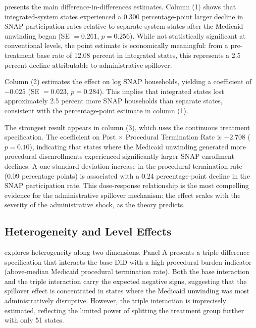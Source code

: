 \documentclass[12pt]{article}
\begin{document}


 presents the main difference-in-differences estimates. Column (1) shows that integrated-system states experienced a 0.300 percentage-point larger decline in SNAP participation rates relative to separate-system states after the Medicaid unwinding began (SE $= 0.261$, $p = 0.256$). While not statistically significant at conventional levels, the point estimate is economically meaningful: from a pre-treatment base rate of 12.08 percent in integrated states, this represents a 2.5 percent decline attributable to administrative spillover.

Column (2) estimates the effect on log SNAP households, yielding a coefficient of $-0.025$ (SE $= 0.023$, $p = 0.284$). This implies that integrated states lost approximately 2.5 percent more SNAP households than separate states, consistent with the percentage-point estimate in column (1).

The strongest result appears in column (3), which uses the continuous treatment specification. The coefficient on Post $\times$ Procedural Termination Rate is $-2.708$ ($p = 0.10$), indicating that states where the Medicaid unwinding generated more procedural disenrollments experienced significantly larger SNAP enrollment declines. A one-standard-deviation increase in the procedural termination rate (0.09 percentage points) is associated with a 0.24 percentage-point decline in the SNAP participation rate. This dose-response relationship is the most compelling evidence for the administrative spillover mechanism: the effect scales with the severity of the administrative shock, as the theory predicts.

\subsection{Heterogeneity and Level Effects}



 explores heterogeneity along two dimensions. Panel A presents a triple-difference specification that interacts the base DiD with a high procedural burden indicator (above-median Medicaid procedural termination rate). Both the base interaction and the triple interaction carry the expected negative signs, suggesting that the spillover effect is concentrated in states where the Medicaid unwinding was most administratively disruptive. However, the triple interaction is imprecisely estimated, reflecting the limited power of splitting the treatment group further with only 51 states.
\end{document}
